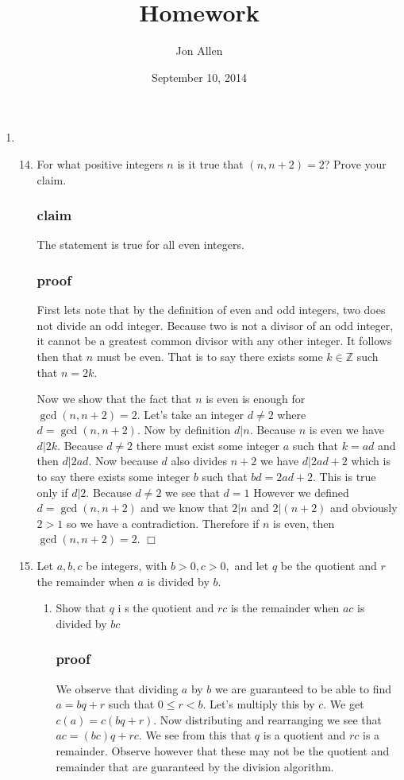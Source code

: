 \documentclass[letterpaper]{article}
\begin{document}
\title{Homework}
\date{September 10, 2014}
\author{Jon Allen}
\maketitle
\renewcommand{\labelenumi}{1.\arabic{enumi}}
\renewcommand{\labelenumii}{\arabic{enumii}.}
\renewcommand{\labelenumiii}{(\alph{enumiii})}
\begin{enumerate}
\item
\begin{enumerate}
\setcounter{enumii}{13}
\item
For what positive integers $n$ is it true that $(n,n+2)=2$? Prove your claim.
\subsubsection*{claim}
The statement is true for all even integers.
\subsubsection*{proof}
First lets note that by the definition of even and odd integers, two does not divide an odd integer. Because two is not a divisor of an odd integer, it cannot be a greatest common divisor with any other integer. It follows then that $n$ must be even. That is to say there exists some $k\in\mathbb{Z}$ such that $n=2k$.

Now we show that the fact that $n$ is even  is enough for $\gcd(n,n+2)=2$. Let's take an integer $d\ne 2$ where $d=\gcd(n,n+2)$. Now by definition $d|n$. Because $n$ is even we have $d|2k$. Because $d\ne2$ there must exist some integer $a$ such that $k=ad$ and then $d|2ad$. Now because $d$ also divides $n+2$ we have $d|2ad+2$ which is to say there exists some integer $b$ such that $bd=2ad+2$. This is true only if $d|2$. Because $d\ne2$ we see that $d=1$ However we defined $d=\gcd(n,n+2)$ and we know that $2|n$ and $2|(n+2)$ and obviously $2>1$ so we have a contradiction. Therefore if $n$ is even, then $\gcd(n,n+2)=2$. $\Box$
\setcounter{enumii}{15}
\item
Let $a,b,c$ be integers, with $b>0, c>0,$ and let $q$ be the quotient and $r$ the remainder when $a$ is divided by $b$.
\begin{enumerate}
\item
Show that $q$ i s the quotient and $rc$ is the remainder when $ac$ is divided by $bc$

\subsubsection*{proof}
We observe that dividing $a$ by $b$ we are guaranteed to be able to find $a=bq+r$ such that $0\le r<b$. Let's multiply this by $c$. We get $c(a)=c(bq+r)$. Now distributing and rearranging we see that $ac=(bc)q+rc$. We see from this that $q$ is a quotient and $rc$ is a remainder. Observe however that these may not be the quotient and remainder that are guaranteed by the division algorithm.


\end{enumerate}
\end{enumerate}
\end{enumerate}
\end{document}
